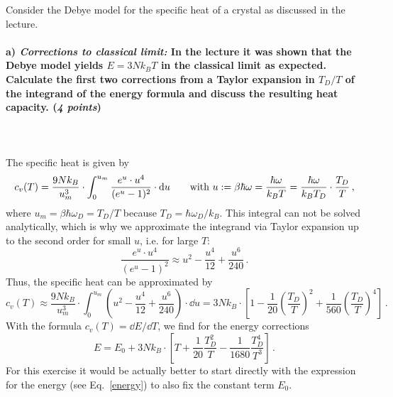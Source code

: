 Consider the Debye model for the specific heat of a crystal as discussed 
in the lecture.

\paragraph{a) \textit{Corrections to classical limit:} In the lecture it was 
    shown that the Debye model yields $E=3Nk_BT$ in the classical limit as 
    expected. Calculate the first two corrections from a Taylor expansion in 
    $T_D/T$ of the integrand of the energy formula and discuss the 
    resulting heat capacity. (\textit{4 points})
} \ \\
    \\
    The specific heat is given by
    \begin{equation}
        c_v(T)
        =\frac{9Nk_B}{u^3_m}\cdot\int_0^{u_m}
        \frac{e^u\cdot u^4}{(e^u-1)^2}\cdot\mathrm{d} u
        \ \ \ \ \ \ \textnormal{with }
        u:=\beta\hbar\omega=\frac{\hbar\omega}{k_BT}
        =\frac{\hbar\omega}{k_BT_D}\cdot\frac{T_D}{T} \,,
    \end{equation}
    where $u_m = \beta\hbar\omega_D = T_D/T$ because $T_D = \hbar\omega_D/k_B$.
    This integral can not be solved analytically, which is why we approximate
    the integrand via Taylor expansion up to the second order for small $u$,
    i.e. for large $T$:
    \begin{equation}
        \frac{e^u\cdot u^4}{(e^u-1)^2}
        \approx u^2-\frac{u^4}{12}+\frac{u^6}{240} \,.
    \end{equation}
    Thus, the specific heat can be approximated by
    \begin{equation}
        c_v(T)
        \approx\frac{9Nk_B}{u^3_m}\cdot\int_0^{u_m}
        \left(u^2-\frac{u^4}{12}+\frac{u^6}{240}\right)\cdot\dd u
        = 3Nk_B\cdot\left[1-\frac{1}{20}\left(\frac{T_D}{T}\right)^2+\frac{1}{560}\left(\frac{T_D}{T}\right)^4\right] \,.
    \end{equation}
    With the formula $c_v(T) = \dd E/\dd T$, we find for the energy corrections
    \begin{equation}
        E
        = E_0 + 3Nk_B\cdot\left[T+\frac{1}{20}\frac{T_D^2}{T}-\frac{1}{1680}\frac{T_D^4}{T^3}\right] \,.
    \end{equation}
    For this exercise it would be actually better to start directly with the expression for the
    energy (see Eq.~\eqref{energy}) to also fix the constant term $E_0$.

